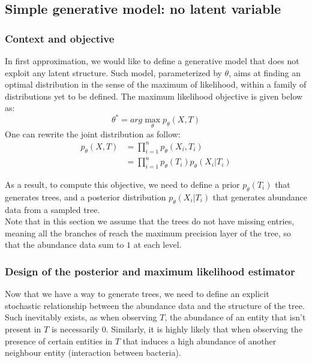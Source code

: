 \subsection{Simple generative model: no latent variable}

\subsubsection{Context and objective}

In first approximation, we would like to define a generative model that does not exploit any latent structure.
Such model, parameterized by $\theta$, aims at finding an optimal distribution in the sense of the maximum of likelihood,
within a family of distributions yet to be defined.
The maximum likelihood objective is given below as:
$$
\theta^* = arg\max_{\theta} p_{\theta}(X, T)
$$
One can rewrite the joint distribution as follow:
$$
\begin{align}
    p_{\theta}(X, T) &= \prod_{i=1}^n p_{\theta}(X_i, T_i) \\
                    &= \prod_{i=1}^n p_{\theta}(T_i) p_{\theta}(X_i | T_i)
\end{align}
$$

As a result, to compute this objective, we need to define a prior $p_{\theta}(T_i)$ that generates trees,
and a posterior distribution $p_{\theta}(X_i | T_i)$ that generates abundance data from a sampled tree. \\

Note that in this section we assume that the trees do not have missing entries, meaning all the branches of
reach the maximum precision layer of the tree, so that the abundance data sum to $1$ at each level. \\



\subsubsection{Design of the posterior and maximum likelihood estimator}


Now that we have a way to generate trees, we need to define an explicit stochastic relationship between the abundance
data and the structure of the tree.
Such inevitably exists, as when observing $T$, the abundance of an entity that isn't present in $T$ is necessarily 0.
Similarly, it is highly likely that when observing the presence of certain entities in $T$ that induces a high abundance of
another neighbour entity (interaction between bacteria). \\


